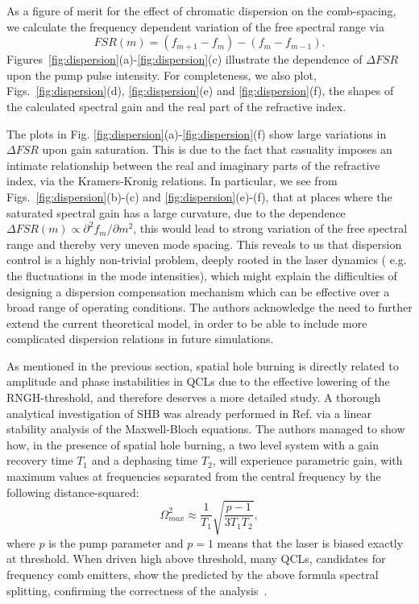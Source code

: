\documentclass[journal]{IEEEtran}
\begin{document}
	As a figure of merit for the effect of chromatic dispersion on the comb-spacing, we calculate the frequency dependent variation of the free spectral range \cite{herr2012universal} via 
	\begin{equation}
	FSR(m) = (f_{m+1}-f_{m}) - (f_{m} - f_{m-1}).
	\end{equation} 
	Figures~\ref{fig:dispersion}(a)-\ref{fig:dispersion}(c) illustrate the dependence of $\Delta FSR$ upon the pump pulse intensity. For completeness, we also plot, Figs.~\ref{fig:dispersion}(d), \ref{fig:dispersion}(e) and \ref{fig:dispersion}(f), the shapes of the calculated spectral gain and the real part of the refractive index. 
	
	The plots in Fig. \ref{fig:dispersion}(a)-\ref{fig:dispersion}(f) show large variations in $\Delta FSR$ upon gain saturation. This is due to the fact that casuality \cite{toll1956} imposes an intimate relationship between the real and imaginary parts of the refractive index, via the Kramers-Kronig relations.  In particular, we see from Figs.~\ref{fig:dispersion}(b)-(c) and \ref{fig:dispersion}(e)-(f), that at places where the saturated spectral gain has a large curvature, due to the dependence $\Delta FSR(m) \propto \partial^2 f_m/\partial m^2 $, this would lead  to strong variation of the free spectral range and thereby very uneven mode spacing. This reveals to us that dispersion control is a highly non-trivial problem, deeply rooted in the laser dynamics ( e.g. the fluctuations in the mode intensities), which might explain the difficulties of designing a dispersion compensation mechanism which can be effective over a broad range of operating conditions. The authors acknowledge the need to further extend the current theoretical model, in order to be able to include more complicated dispersion relations in future simulations. 
	
	As mentioned in the previous section, spatial hole burning is directly related to amplitude and phase instabilities in QCLs due to the effective lowering of the RNGH-threshold, and therefore deserves a more detailed study.  A thorough analytical investigation of SHB was already performed in Ref. \cite{gordon2008multimode} via a linear stability analysis of the Maxwell-Bloch equations. The authors managed to show how, in the presence of spatial hole burning, a two level system with a gain recovery time $T_1$ and a dephasing time $T_2$, will experience parametric gain, with maximum values at frequencies separated from the central frequency by the following distance-squared:
	\begin{equation}
	\Omega_{max}^2 \approx \frac{1}{T_1} \sqrt{\frac{p-1}{3T_1T_2}},
	\end{equation}
	where $p$ is the pump parameter and $p=1$ means that the laser is biased exactly at threshold. When driven high above threshold, many QCLs, candidates for frequency comb emitters, show the predicted by the above formula spectral splitting, confirming the correctness of the analysis~\cite{wang2007coherent}.
	
\end{document}
